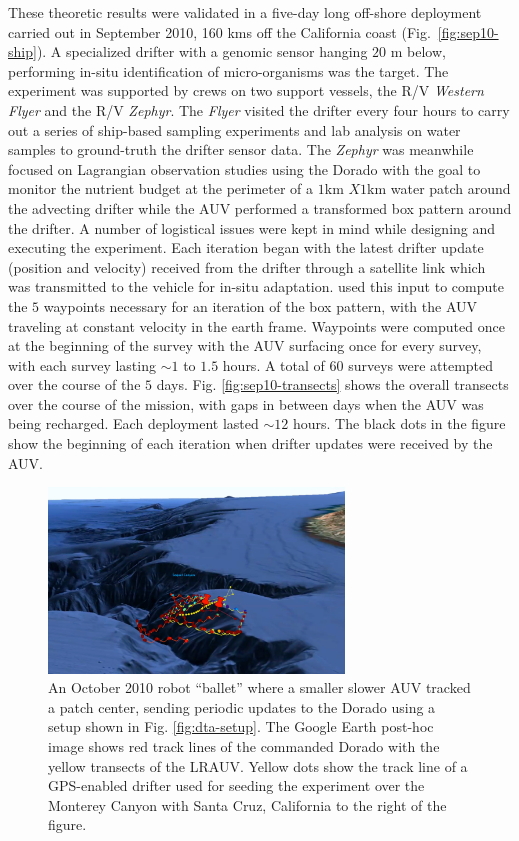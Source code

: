 These theoretic results were validated in a five-day long off-shore
deployment carried out in September 2010, 160 kms off the California
coast (Fig.~\ref{fig:sep10-ship}). A specialized drifter with a
genomic sensor \cite{scholin09} hanging $20$ m below, performing
in-situ identification of micro-organisms was the target. The
experiment was supported by crews on two support vessels, the R/V
\emph{Western Flyer} and the R/V \emph{Zephyr}. The \emph{Flyer}
visited the drifter every four hours to carry out a series of
ship-based sampling experiments and lab analysis on water samples to
ground-truth the drifter sensor data. The \emph{Zephyr} was meanwhile
focused on Lagrangian observation studies using the Dorado with the
goal to monitor the nutrient budget at the perimeter of a $1$km $X
1$km water patch around the advecting drifter while the AUV performed
a transformed box pattern around the drifter. A number of logistical
issues were kept in mind while designing and executing the
experiment. Each iteration began with the latest drifter update
(position and velocity) received from the drifter through a satellite
link which was transmitted to the vehicle for in-situ adaptation. \rx
used this input to compute the $5$ waypoints necessary for an
iteration of the box pattern, with the AUV traveling at constant
velocity in the earth frame. Waypoints were computed once at the
beginning of the survey with the AUV surfacing once for every survey,
with each survey lasting $\sim1$ to $1.5$ hours. A total of 60 surveys
were attempted over the course of the $5$
days. Fig. \ref{fig:sep10-transects} shows the overall transects over
the course of the mission, with gaps in between days when the AUV was
being recharged. Each deployment lasted $\sim12$ hours. The black dots
in the figure show the beginning of each iteration when drifter
updates were received by the AUV.


\begin{figure}[t]
\centering
\includegraphics[width=0.7\textwidth]{figs/oct10-ballet.pdf}
\caption{\small An October 2010 robot ``ballet'' where a smaller
  slower AUV tracked a patch center, sending periodic updates to the
  Dorado using a setup shown in Fig. \ref{fig:dta-setup}. The Google
  Earth post-hoc image shows {\color{red}red} track lines of the \rx
  commanded Dorado with the {\color{yellow}yellow} transects of the
  LRAUV. {\color{yellow}Yellow} dots show the track line of a
  GPS-enabled drifter used for seeding the experiment over the
  Monterey Canyon with Santa Cruz, California to the right of the
  figure.}
\label{fig:ballet}
\end{figure}

